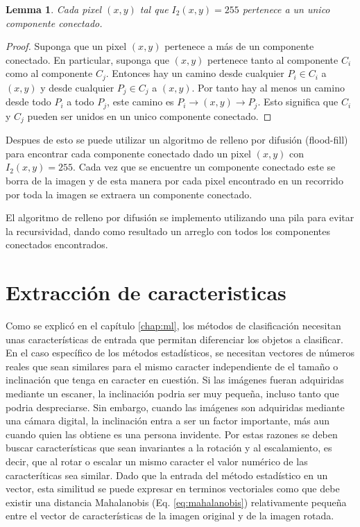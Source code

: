 \documentclass[a4paper, 11pt, oneside]{report}
\begin{document}
\newtheorem{pixHasOneC}{Lemma}
\begin{pixHasOneC}
	Cada pixel $(x,y)$ tal que $I_2(x,y)=255$ pertenece a un unico componente conectado.
\end{pixHasOneC}
\begin{proof}
	Suponga que un pixel $(x,y)$ pertenece a más de un componente conectado. En particular, suponga que $(x,y)$ pertenece tanto al componente $C_i$ como al componente $C_j$. Entonces hay un camino desde cualquier $P_i \in C_i$ a $(x,y)$ y desde cualquier $P_j \in C_j$ a $(x,y)$. Por tanto hay al menos un camino desde todo $P_i$ a todo $P_j$, este camino es $P_i \rightarrow (x,y) \rightarrow P_j$. Esto significa que $C_i$ y $C_j$ pueden ser unidos en un unico componente conectado.
\end{proof}

Despues de esto se puede utilizar un algoritmo de relleno por difusión (flood-fill) para encontrar cada componente conectado dado un pixel $(x,y)$ con $I_2(x,y)=255$. Cada vez que se encuentre un componente conectado este se borra de la imagen y de esta manera por cada pixel encontrado en un recorrido por toda la imagen se extraera un componente conectado.

El algoritmo de relleno por difusión se implemento utilizando una pila para evitar la recursividad, dando como resultado un arreglo con todos los componentes conectados encontrados.

\section{Extracción de caracteristicas}

Como se explicó en el capítulo \ref{chap:ml}, los métodos de clasificación necesitan unas características de entrada que permitan diferenciar los objetos a clasificar. En el caso específico de los métodos estadísticos, se necesitan vectores de números reales que sean similares para el mismo caracter independiente de el tamaño o inclinación que tenga en caracter en cuestión. Si las imágenes fueran adquiridas mediante un escaner, la inclinación podria ser muy pequeña, incluso tanto que podria despreciarse. Sin embargo, cuando las imágenes son adquiridas mediante una cámara digital, la inclinación entra a ser un factor importante, más aun cuando quien las obtiene es una persona invidente. Por estas razones se deben buscar características que sean invariantes a la rotación y al escalamiento, es decir, que al rotar o escalar un mismo caracter el valor numérico de las caracteríticas sea similar. Dado que la entrada del método estadístico en un vector, esta similitud se puede expresar en terminos vectoriales como que debe existir una distancia Mahalanobis (Eq. \ref{eq:mahalanobis}) relativamente pequeña entre el vector de características de la imagen original y de la imagen rotada.
\end{document}
